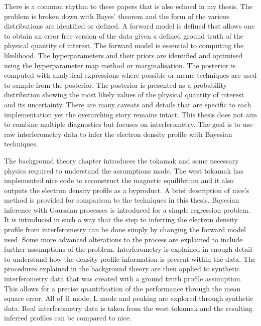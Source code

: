 There is a common rhythm to these papers that is also echoed in my thesis. The problem is broken down with Bayes' theorem and the form of the various distributions are identified or defined. A forward model is defined that allows one to obtain an error free version of the data given a defined ground truth of the physical quantity of interest. The forward model is essential to computing the likelihood. The hyperparameters and their priors are identified and optimised using the hyperparameter \gls{map} method or marginalisation. The posterior is computed with analytical expressions where possible or \gls{mcmc} techniques are used to sample from the posterior. The posterior is presented as a probability distribution showing the most likely values of the physical quantity of interest and its uncertainty. There are many caveats and details that are specific to each implementation yet the overarching story remains intact. This thesis does not aim to combine multiple diagnostics but focuses on interferometry. The goal is to use raw interferometry data to infer the electron density profile with Bayesian techniques. 

The background theory chapter introduces the tokamak and some necessary physics required to understand the assumptions made. The \gls{west} tokamak has implemented \gls{nice} code to reconstruct the magnetic equilibrium and it also outputs the electron density profile as a byproduct. A brief description of \gls{nice}'s method is provided for comparison to the techniques in this thesis. Bayesian inference with Gaussian processes is introduced for a simple regression problem. It is introduced in such a way that the step to inferring the electron density profile from interferometry can be done simply by changing the forward model used. Some more advanced alterations to the process are explained to include further assumptions of the problem. Interferometry is explained in enough detail to understand how the density profile information is present within the data. The procedures explained in the background theory are then applied to synthetic interferometry data that was created with a ground truth profile assumption. This allows for a precise quantification of the performance through the mean square error. All of H mode, L mode and peaking are explored through synthetic data. Real interferometry data is taken from the \gls{west} tokamak and the resulting inferred profiles can be compared to \gls{nice}. 


